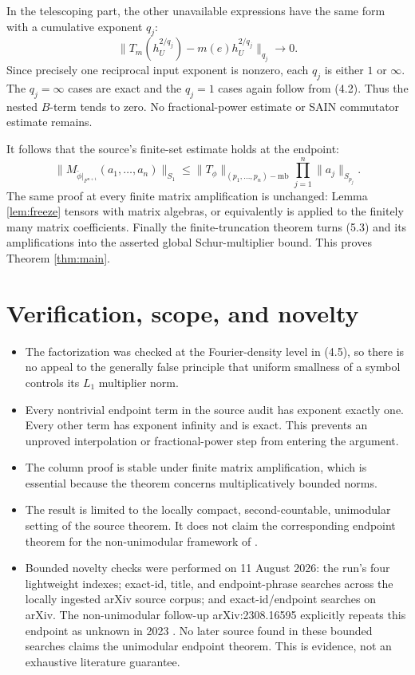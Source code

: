 \documentclass[11pt]{article}
\newcommand{\mb}{\mathrm{mb}}
\begin{document}
In the telescoping part, the other unavailable expressions have the same
form with a cumulative exponent \(q_j\):
\[
 \|T_m(h_U^{2/q_j})-m(e)h_U^{2/q_j}\|_{q_j}\longrightarrow0.       \tag{5.2}
\]
Since precisely one reciprocal input exponent is nonzero, each \(q_j\) is
either \(1\) or \(\infty\).  The \(q_j=\infty\) cases are exact and the
\(q_j=1\) cases again follow from (4.2).  Thus the nested \(B\)-term tends to
zero.  No fractional-power estimate or SAIN commutator estimate remains.

It follows that the source's finite-set estimate holds at the endpoint:
\[
 \|M_{\widetilde\phi|_{F^{n+1}}}
       (a_1,\ldots,a_n)\|_{S_1}
 \le \|T_\phi\|_{(p_1,\ldots,p_n)-\mb}
       \prod_{j=1}^n\|a_j\|_{S_{p_j}}.                             \tag{5.3}
\]
The same proof at every finite matrix amplification is unchanged: Lemma
\ref{lem:freeze} tensors with matrix algebras, or equivalently is applied to
the finitely many matrix coefficients.  Finally the finite-truncation theorem
\cite[Theorem 2.2]{CKV} turns (5.3) and its amplifications into the asserted
global Schur-multiplier bound.  This proves Theorem \ref{thm:main}.

\section{Verification, scope, and novelty}

\begin{itemize}
\item The factorization was checked at the Fourier-density level in (4.5), so
there is no appeal to the generally false principle that uniform smallness of
a symbol controls its \(L_1\) multiplier norm.
\item Every nontrivial endpoint term in the source audit has exponent exactly
one.  Every other term has exponent infinity and is exact.  This prevents an
unproved interpolation or fractional-power step from entering the argument.
\item The column proof is stable under finite matrix amplification, which is
essential because the theorem concerns multiplicatively bounded norms.
\item The result is limited to the locally compact, second-countable,
unimodular setting of the source theorem.  It does not claim the corresponding
endpoint theorem for the non-unimodular framework of \cite{Vos}.
\item Bounded novelty checks were performed on 11 August 2026: the run's four
lightweight indexes; exact-id, title, and endpoint-phrase searches across the
locally ingested arXiv source corpus; and exact-id/endpoint searches on arXiv.
The non-unimodular follow-up arXiv:2308.16595 explicitly repeats this endpoint
as unknown in 2023 \cite{Vos}.  No later source found in these bounded searches
claims the unimodular endpoint theorem.  This is evidence, not an exhaustive
literature guarantee.
\end{itemize}
\end{document}
